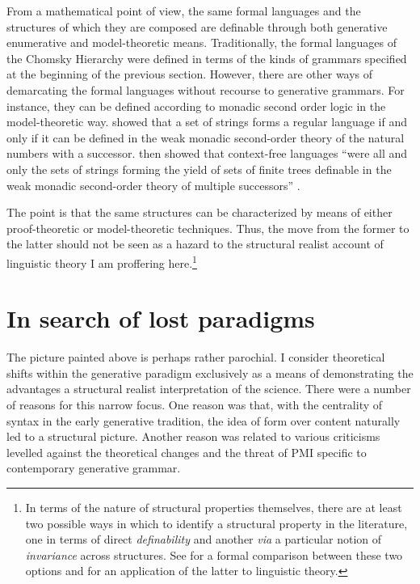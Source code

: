\documentclass[output=paper]{langscibook}
\begin{document}
From a mathematical point of view, the same formal languages and the structures of which they are composed are definable through both generative enumerative and model-theoretic means. Traditionally, the formal languages of the Chomsky Hierarchy were defined in terms of the kinds of grammars specified at the beginning of the previous section. However, there are other ways of demarcating the formal languages without recourse to generative grammars. For instance, they can be defined according to monadic second order logic in the model-theoretic way. \cite{Buchi1960} showed that a set of strings forms a regular language if and only if it can be defined in the weak monadic second-order theory of the natural numbers with a successor. \cite{Thatcher1968} then showed that context-free languages ``were all and only the sets of strings forming the yield of sets of finite trees definable in the weak monadic second-order theory of multiple successors'' \citep[1117]{Rogers1998b}.

The point is that the same structures can be characterized by means of either proof-theoretic or model-theoretic techniques. Thus, the move from the former to the latter should not be seen as a hazard to the structural realist account of linguistic theory I am proffering here.\footnote{In terms of the nature of structural properties themselves, there are at least two possible ways in which to identify a structural property in the literature, one in terms of direct \textit{definability} and another \emph{via} a particular notion of \textit{invariance} across structures. See \cite{Korbmacher2017} for a formal comparison between these two options and \cite{Johnson2015} for an application of the latter to linguistic theory.} 

\section{In search of lost paradigms}
\label{sec:nefdt:lostparadigms}

The picture painted above is perhaps rather parochial. I consider theoretical shifts within the generative paradigm exclusively as a means of demonstrating the advantages a structural realist interpretation of the science. There were a number of reasons for this narrow focus. One reason was that, with the centrality of syntax in the early generative tradition, the idea of form over content naturally led to a structural picture. Another reason was related to various criticisms levelled against the theoretical changes and the threat of PMI specific to contemporary generative grammar. 
\end{document}
